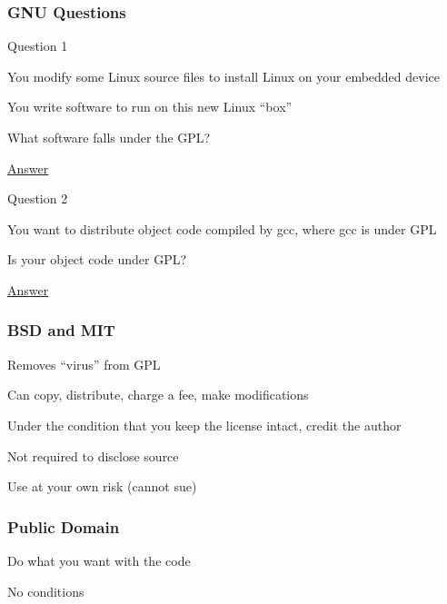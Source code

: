\documentclass[t,12pt,numbers,fleqn]{beamer}
\begin{document}

\begin{frame}
\frametitle{GNU Questions}

\bi
\item Question 1
\bi
\item You modify some Linux source files to install Linux on your embedded
  device
\item You write software to run on this new Linux ``box''
\item What software falls under the GPL?
\item \href{http://www.softwarefreedom.org/resources/2008/compliance-guide.html}{Answer}
\ei
\item Question 2
\bi
\item You want to distribute object code compiled by gcc, where gcc is under GPL
\item Is your object code under GPL?
\item \href{https://www.gnu.org/licenses/gcc-exception-3.1-faq.en.html}{Answer}
\ei
\ei

\end{frame}


\begin{frame}
\frametitle{BSD and MIT}

\bi
\item Removes ``virus'' from GPL
\item Can copy, distribute, charge a fee, make modifications
\item Under the condition that you keep the license intact, credit the author
\item Not required to disclose source 
\item Use at your own risk (cannot sue)
\ei

\end{frame}


\begin{frame}
\frametitle{Public Domain}

\bi
\item Do what you want with the code
\item No conditions
\ei

\end{frame}
\end{document}
